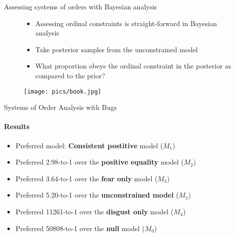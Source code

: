 \documentclass[ignorenonframetext,t]{beamer}
\providecommand{\tightlist}{%
  \setlength{\itemsep}{0pt}\setlength{\parskip}{0pt}}
\begin{document}
\begin{frame}{Assessing systems of orders with Bayesian analysis}

\vspace*{1cm}

\begin{figure}
\centering
\begin{minipage}{.6\textwidth}

\begin{itemize}
\item Assessing ordinal constraints is straight-forward in Bayesian analysis
\item Take posterior samples from the unconstrained model
\item What proportion obeys the ordinal constraint in the posterior as compared to the prior?
\end{itemize}

\end{minipage}%
\begin{minipage}{.4\textwidth}
  \centering
  \texttt{[image: pics/book.jpg]}
\end{minipage}
\end{figure}

\end{frame}

\begin{frame}{Systems of Order Analysis with Bugs}

\framesubtitle{Results}

\vspace*{.5cm}

\begin{itemize}[<+->]
\tightlist
\item
  Preferred model: \textbf{Consistent postitive} model (\(M_1\))
\end{itemize}

\begin{itemize}[<+->]
\tightlist
\item
  Preferred 2.98-to-1 over the \textbf{positive equality} model
  (\(M_2\))
\item
  Preferred 3.64-to-1 over the \textbf{fear only} model (\(M_3\))
\item
  Preferred 5.20-to-1 over the \textbf{unconstrained model} (\(M_5\))
\item
  Preferred 11261-to-1 over the \textbf{disgust only} model (\(M_4\))
\item
  Preferred 50808-to-1 over the \textbf{null} model (\(M_0\))
\end{itemize}

\end{frame}
\end{document}
